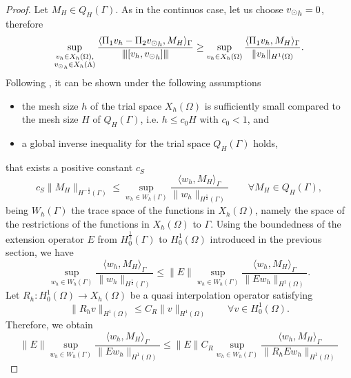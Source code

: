 \begin{proof}
Let $M_H \in Q_H(\Gamma)$. As in the continuos case, let us choose ${v_{\odot}}_h =0$, therefore 
\begin{equation*}
\sup_{\substack{v_h \in X_h(\Omega),\\ {v_{\odot}}_h \in X_h(\Lambda)}} \frac{ \langle \Pi_1 v_h - \Pi_2 {v_{\odot}}_h, M_H \rangle _{\Gamma}} {{\left\vert\kern-0.25ex\left\vert\kern-0.25ex\left\vert [v_h, {v_{\odot}}_h] \right\vert\kern-0.25ex\right\vert\kern-0.25ex\right\vert}}
\geq \sup_{v_h \in X_h(\Omega)} \frac{ \langle \Pi_1 v_h, M_H \rangle _{\Gamma} } {\|v_h\|_{H^1(\Omega)}}.
\end{equation*}
Following \cite[Theorem 11.5]{steinbach2007numerical}, it can be shown under the following assumptions 
\begin{itemize}
\item the mesh size $h$ of the trial space $X_h(\Omega)$ is sufficiently small compared to the mesh size $H$ of $Q_H(\Gamma)$, i.e. $h \leq c_0 H$ with $c_0 < 1$, and
\item a global inverse inequality for the trial space $Q_H(\Gamma)$ holds,
\end{itemize}
that exists a positive constant $c_S$
\begin{equation}\label{infsup_tracespace}
c_S \|M_H\|_{H^{-\frac 12}(\Gamma)} \leq 
\sup_{w_h \in W_h(\Gamma)} \frac{ \langle w_h, M_H \rangle _{\Gamma} } {\|w_h\|_{H^{\frac 12}(\Gamma)}} \qquad \forall M_H \in Q_H(\Gamma),
\end{equation}
being $W_h(\Gamma)$ the trace space of the functions in $X_h(\Omega)$, namely the space of the restrictions of the functions in $X_h(\Omega)$ to $\Gamma$. 
Using the boundedness of the extension operator $E$ from $H^{\frac 12}_0(\Gamma)$ to $H^1_0(\Omega)$ introduced in the previous section, we have
\begin{equation*}
\sup_{w_h \in W_h(\Gamma)} \frac{ \langle w_h, M_H \rangle _{\Gamma} } {\|w_h\|_{H^{\frac 12}(\Gamma)}} 
\leq 
\|E\| \sup_{w_h \in W_h(\Gamma)} \frac{ \langle w_h, M_H \rangle _{\Gamma} } {\|E w_h\|_{H^1(\Omega)}}.
\end{equation*}
Let $R_h: H^1_0(\Omega) \rightarrow X_h(\Omega)$ be a quasi interpolation operator satisfying 
\begin{equation*}
\|R_h v\|_{H^1(\Omega)} \leq C_R \|v\|_{H^1(\Omega)} \qquad \forall v \in H^1_0(\Omega).
\end{equation*}
Therefore, we obtain 
\begin{equation*}
\|E\| \sup_{w_h \in W_h(\Gamma)} \frac{ \langle w_h, M_H \rangle _{\Gamma} } {\|E w_h\|_{H^1(\Omega)}}
\leq
\|E\| C_R \sup_{w_h \in W_h(\Gamma)} \frac{ \langle w_h, M_H \rangle_{\Gamma} } {\|R_hE w_h\|_{H^1(\Omega)}}

\end{equation*}
\end{proof}
